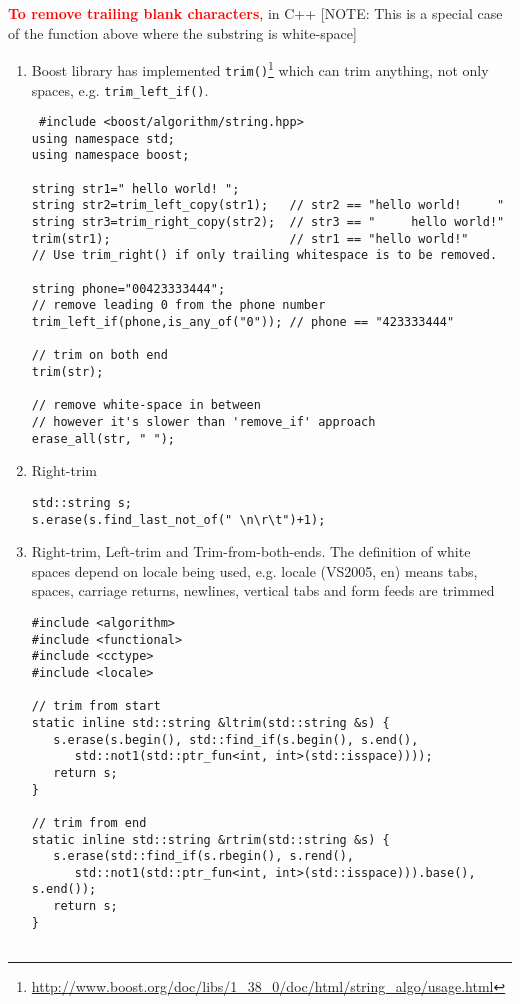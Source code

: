 \textcolor{red}{\bf To remove trailing blank characters}, in C++ [NOTE: This is
a special case of the function above where the substring is white-space]
\begin{enumerate}
  \item Boost library has implemented
  \verb!trim()!\footnote{\url{http://www.boost.org/doc/libs/1_38_0/doc/html/string_algo/usage.html}}
  which can trim anything, not only spaces, e.g. \verb!trim_left_if()!.
\begin{verbatim}
 #include <boost/algorithm/string.hpp>
using namespace std;
using namespace boost;
  
string str1=" hello world! ";
string str2=trim_left_copy(str1);   // str2 == "hello world!     "
string str3=trim_right_copy(str2);  // str3 == "     hello world!"
trim(str1);                         // str1 == "hello world!"
// Use trim_right() if only trailing whitespace is to be removed.

string phone="00423333444";
// remove leading 0 from the phone number
trim_left_if(phone,is_any_of("0")); // phone == "423333444"

// trim on both end
trim(str);

// remove white-space in between
// however it's slower than 'remove_if' approach
erase_all(str, " ");        
\end{verbatim}
  
  \item Right-trim
  \begin{verbatim}
std::string s;
s.erase(s.find_last_not_of(" \n\r\t")+1);
  \end{verbatim}
  
  \item Right-trim, Left-trim and Trim-from-both-ends. The definition of white
  spaces depend on locale being used, e.g. locale (VS2005, en) means tabs,
  spaces, carriage returns, newlines, vertical tabs and form feeds are trimmed
  \begin{verbatim}
#include <algorithm> 
#include <functional> 
#include <cctype>
#include <locale>

// trim from start
static inline std::string &ltrim(std::string &s) {
   s.erase(s.begin(), std::find_if(s.begin(), s.end(), 
      std::not1(std::ptr_fun<int, int>(std::isspace))));
   return s;
}

// trim from end
static inline std::string &rtrim(std::string &s) {
   s.erase(std::find_if(s.rbegin(), s.rend(), 
      std::not1(std::ptr_fun<int, int>(std::isspace))).base(), s.end());
   return s;
}


\end{verbatim}
\end{enumerate}
